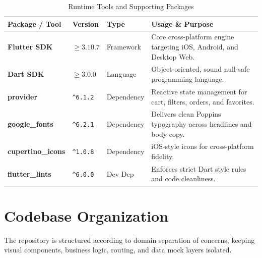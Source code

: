 \documentclass[11pt,a4paper]{article}
\begin{document}
\begin{table}[htbp]
\caption{Runtime Tools and Supporting Packages}
\label{tab:tech_stack}
\centering
\small
\begin{tabularx}{\linewidth}{@{}lllX@{}}
\toprule
\textbf{Package / Tool} & \textbf{Version} & \textbf{Type} & \textbf{Usage \& Purpose} \\
\midrule
\textbf{Flutter SDK} & $\ge 3.10.7$ & Framework & Core cross-platform engine targeting iOS, Android, and Desktop Web. \\
\textbf{Dart SDK} & $\ge 3.0.0$ & Language & Object-oriented, sound null-safe programming language. \\
\textbf{provider} & \texttt{\^{}6.1.2} & Dependency & Reactive state management for cart, filters, orders, and favorites. \\
\textbf{google\_fonts} & \texttt{\^{}6.2.1} & Dependency & Delivers clean Poppins typography across headlines and body copy. \\
\textbf{cupertino\_icons} & \texttt{\^{}1.0.8} & Dependency & iOS-style icons for cross-platform fidelity. \\
\textbf{flutter\_lints} & \texttt{\^{}6.0.0} & Dev Dep & Enforces strict Dart style rules and code cleanliness. \\
\bottomrule
\end{tabularx}
\end{table}

\FloatBarrier

\section{Codebase Organization}

The repository is structured according to domain separation of concerns, keeping visual components, business logic, routing, and data mock layers isolated.
\end{document}
